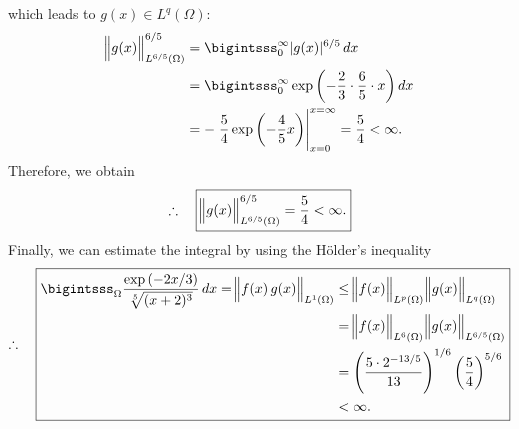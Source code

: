 \documentclass[12pt]{article}
\begin{document}
which leads to $g(x)\in L^q(\Omega)$:
\begin{align}
	\norm[2]{g(x)}_{L^{6/5}(\Omega)}^{6/5}
	 & = 
	\bigintsss_{0}^{\infty}
	|g(x)|^{6/5} \,dx
	\notag                                                                                                           \\
	 & = 
	\bigintsss_{0}^{\infty}
	\exp{ \left(-\frac{2}{3}\cdot\frac{6}{5}\cdot x \right)} \,dx                                             \notag \\
	 & = -\left.\frac{5}{4} \exp{\left( -\frac{4}{5}x \right)}\right|_{x=0}^{x=\infty} 
	= \frac{5}{4} < \infty.    
\end{align}
Therefore, we obtain
\begin{align}
	\therefore\quad\boxed{
	\norm[2]{g(x)}_{L^{6/5}(\Omega)}^{6/5} = \frac{5}{4} < \infty.   
	}
\end{align}
Finally, we can estimate the integral by using the Hölder's inequality
\begin{equation}
	\therefore\quad\boxed{
		\begin{aligned}
			\bigintsss_{\Omega}
			\frac{\exp{(-2x/3)}}{\sqrt[5]{(x + 2)^{3}}} \,dx
			=   \norm[2]{f(x)\,g(x)}_{L^1(\Omega)}
			 & \leq
			\norm[2]{f(x)}_{L^p(\Omega)}
			\norm[2]{g(x)}_{L^q(\Omega)}                          \\
			 & = \norm[2]{f(x)}_{L^6(\Omega)}
			\norm[2]{g(x)}_{L^{6/5}(\Omega)}                      \\
			 & = \left( \frac{5\cdot 2^{-13/5}}{13} \right)^{1/6}
			\left( \frac{5}{4} \right)^{5/6}                      \\
			 & < \infty.
		\end{aligned}
	}
\end{equation}
\end{document}
